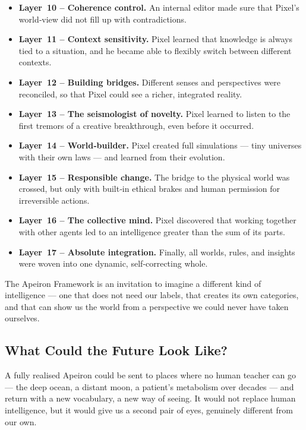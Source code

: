 \begin{itemize}
    \item \textbf{Layer~10 – Coherence control.}
    An internal editor made sure that Pixel's world‑view did not fill
    up with contradictions.

    \item \textbf{Layer~11 – Context sensitivity.}
    Pixel learned that knowledge is always tied to a situation, and he
    became able to flexibly switch between different contexts.

    \item \textbf{Layer~12 – Building bridges.}
    Different senses and perspectives were reconciled, so that Pixel
    could see a richer, integrated reality.

    \item \textbf{Layer~13 – The seismologist of novelty.}
    Pixel learned to listen to the first tremors of a creative
    breakthrough, even before it occurred.

    \item \textbf{Layer~14 – World‑builder.}
    Pixel created full simulations — tiny universes with their own
    laws — and learned from their evolution.

    \item \textbf{Layer~15 – Responsible change.}
    The bridge to the physical world was crossed, but only with
    built‑in ethical brakes and human permission for irreversible
    actions.

    \item \textbf{Layer~16 – The collective mind.}
    Pixel discovered that working together with other agents led to an
    intelligence greater than the sum of its parts.

    \item \textbf{Layer~17 – Absolute integration.}
    Finally, all worlds, rules, and insights were woven into one
    dynamic, self‑correcting whole.
\end{itemize}

The Apeiron Framework is an invitation to imagine a different kind of
intelligence — one that does not need our labels, that creates its own
categories, and that can show us the world from a perspective we could
never have taken ourselves.

\subsection*{What Could the Future Look Like?}

A fully realised Apeiron could be sent to places where no human teacher
can go — the deep ocean, a distant moon, a patient's metabolism over
decades — and return with a new vocabulary, a new way of seeing.
It would not replace human intelligence, but it would give us a second
pair of eyes, genuinely different from our own.


